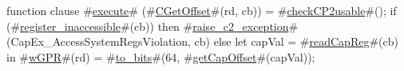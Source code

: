 function clause #\hyperref[zexecute]{execute}# (#\hyperref[zCGetOffset]{CGetOffset}#(rd, cb)) =
{
  #\hyperref[zcheckCPtwousable]{checkCP2usable}#();
  if (#\hyperref[zregisterzyinaccessible]{register\_inaccessible}#(cb)) then
    #\hyperref[zraisezyctwozyexception]{raise\_c2\_exception}#(CapEx_AccessSystemRegsViolation, cb)
  else
    let capVal = #\hyperref[zreadCapReg]{readCapReg}#(cb) in
    #\hyperref[zwGPR]{wGPR}#(rd) = #\hyperref[ztozybits]{to\_bits}#(64, #\hyperref[zgetCapOffset]{getCapOffset}#(capVal));
}
